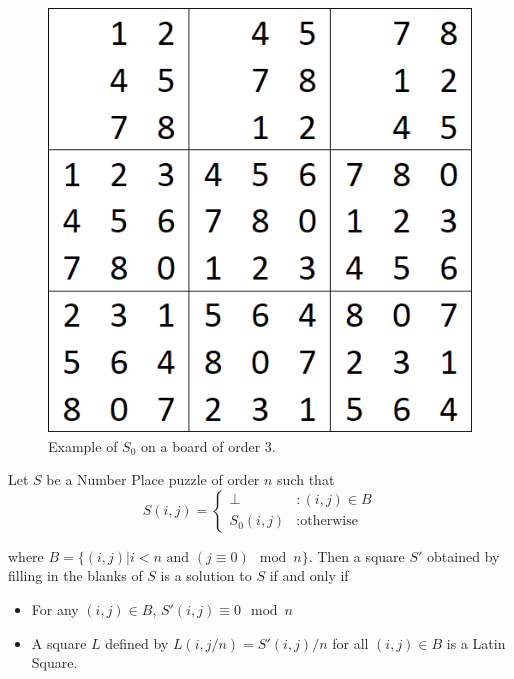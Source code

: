\documentclass[runningheads,a4paper]{llncs}
\begin{document}
\begin{figure}[H]
\label{fig:S0_example}
\centering
\includegraphics[scale=0.25]{sudoku-2.png}
\caption{Example of $S_0$ on a board of order 3.}
\end{figure}

\begin{lemma}
Let $S$ be a Number Place puzzle of order $n$ such that
\begin{displaymath}
S(i,j) = \left\{
\begin{array}{lr}
\perp & : (i,j) \in B\\
S_0 (i,j) & : \text{otherwise}
\end{array}
\right.
\end{displaymath}

where $B = \{ (i,j) | i < n \text{ and } (j \equiv 0) \mod n \}$. Then a square $S'$ obtained by filling in the blanks of $S$ is a solution to $S$ if and only if

\begin{itemize}
\item For any $(i,j) \in B$, $S'(i,j) \equiv 0 \mod n$
\item A square $L$ defined by $L(i, j/n) = S'(i,j)/n$ for all $(i, j) \in B$ is a Latin Square.
\end{itemize}

\end{lemma}
\end{document}
